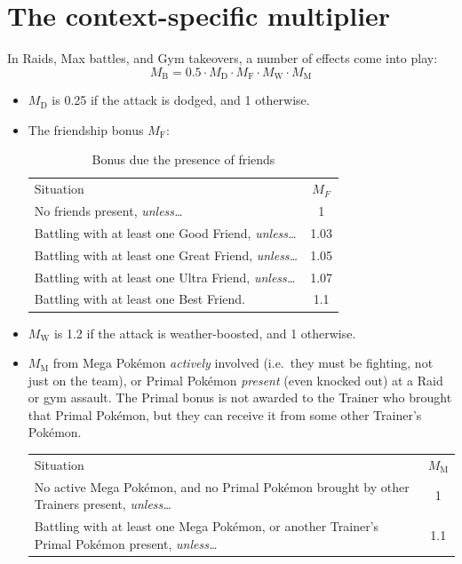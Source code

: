 \section{The context-specific multiplier\label{sec:mbmult}}
In Raids, Max battles, and Gym takeovers, a number of effects come into play:
\[ M_\mathrm{B} = 0.5 \cdot M_\mathrm{D} \cdot M_\mathrm{F} \cdot M_\mathrm{W} \cdot M_\mathrm{M} \]
\begin{itemize}
 \item $M_\mathrm{D}$ is 0.25 if the attack is dodged, and 1 otherwise.
 \item The friendship bonus $M_\mathrm{F}$:
   \begin{table}[h!]
\centering
       \begin{tabular}{lc}
         Situation & $M_F$ \\
         \Midrule
         No friends present, \textit{unless…} & 1 \\
         Battling with at least one Good Friend, \textit{unless…} & 1.03 \\
         Battling with at least one Great Friend, \textit{unless…}  & 1.05 \\
         Battling with at least one Ultra Friend, \textit{unless…} & 1.07 \\
         Battling with at least one Best Friend. & 1.1
       \end{tabular}
     \caption{Bonus due the presence of friends}
   \end{table}
 \item $M_\mathrm{W}$ is 1.2 if the attack is weather-boosted, and 1 otherwise.
 \item $M_\mathrm{M}$ from Mega Pokémon \textit{actively} involved (i.e.\ they
   must be fighting, not just on the team), or Primal Pokémon \textit{present}
   (even knocked out) at a Raid or gym assault. The Primal bonus is not awarded to the Trainer who brought
   that Primal Pokémon, but they can receive it from some other Trainer's Pokémon.
   \begin{table}[h!]
     \centering
       \begin{tabular}{p{}c}
         Situation & $M_\mathrm{M}$ \\
         \Midrule
         No active Mega Pokémon, and no Primal Pokémon brought
          by other Trainers present, \textit{unless…} & 1 \\
         Battling with at least one Mega Pokémon,
          or another Trainer's Primal Pokémon present, \textit{unless…} & 1.1 \\

\end{tabular}
\end{table}
\end{itemize}
